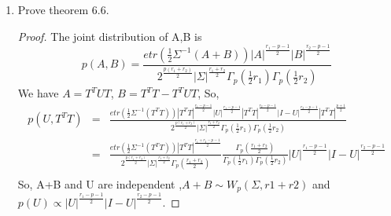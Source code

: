 \documentclass[10pt,a4paper]{article}
\def\BP{{\mathbb P}}
\def\A{{\bm A}}
\def\B{{\bm B}}
\def\X{{\bm X}}
\def\Y{{\bm Y}}
\def\bmu{{\bm \mu}}
\begin{document}
\begin{enumerate}
\begin{proof}[Solution]
\begin{eqnarray*}
\end{eqnarray*}
Since $(\mathbf{B}^T \otimes \mathbf{A}) \, \operatorname{vec}(\mathbf{X}) = \operatorname{vec}(\mathbf{AXB}),$
\begin{eqnarray*}
\BP(\X) &=& \frac{1}{(2\pi)^{\frac{np}{2}}|\A|^{\frac{n}{2}}|\B|^{\frac{n}{2}}}\exp(-\frac{1}{2}(vec(\X^T)-vec(\bmu^T))^T vec(\A^{-1}(\X^T-\bmu^T)(\B^{-1})^T)) \\
\end{eqnarray*}
Since $vec(\X)^Tvec(\Y)=\mbox{tr}(\X^T\Y)$,
\begin{eqnarray*}
\BP(\X) &=& \frac{1}{(2\pi)^{\frac{np}{2}}|\A|^{\frac{n}{2}}|\B|^{\frac{n}{2}}}\exp(-\frac{1}{2}\mbox{tr}((X-\bmu)\A^{-1}(\X^T-\bmu^T)(\B^{-1})^T)) \\
&=& \frac{1}{(2\pi)^{\frac{np}{2}}|\A|^{\frac{n}{2}}|\B|^{\frac{n}{2}}}\exp(-\frac{1}{2}\mbox{tr}(\A^{-1}(\X-\bmu)^T\B^{-1}(\X-\bmu)))
\end{eqnarray*}
\end{proof}
\item Prove theorem 6.6.
\begin{proof}
The joint distribution of A,B is 
$$
p(A,B) = \frac{etr(\frac{1}{2}\Sigma^{-1}(A+B))|A|^{\frac{r_1-p-1}{2}}|B|^{\frac{r_2-p-1}{2}}}{2^{\frac{p(r_1+r_2)}{2}}|\Sigma|^{\frac{r_1+r_2}{2}}\Gamma_p(\frac{1}{2}r_1)\Gamma_p(\frac{1}{2}r_2)}
$$
We have $A=T^TUT$, $B=T^TT-T^TUT$,
So,
\begin{eqnarray*}
p(U,T^TT) &=& \frac{etr(\frac{1}{2}\Sigma^{-1}(T^TT))|T^TT|^{\frac{r_1-p-1}{2}}|U|^{\frac{r_1-p-1}{2}}|T^TT|^{\frac{r_2-p-1}{2}}|I-U|^{\frac{r_2-p-1}{2}}|T^TT|^{\frac{p+1}{2}}}{2^{\frac{p(r_1+r_2)}{2}}|\Sigma|^{\frac{r_1+r_2}{2}}\Gamma_p(\frac{1}{2}r_1)\Gamma_p(\frac{1}{2}r_2)}\\
&=& \frac{etr(\frac{1}{2}\Sigma^{-1}(T^TT))|T^TT|^{\frac{r_1+r_2-p-1}{2}}}{2^{\frac{p(r_1+r_2)}{2}}|\Sigma|^{\frac{r_1+r_2}{2}}\Gamma_p(\frac{r_1+r_2}{2})}\frac{\Gamma_p(\frac{r_1+r_2}{2})}{\Gamma_p(\frac{1}{2}r_1)\Gamma_p(\frac{1}{2}r_2)}|U|^{\frac{r_1-p-1}{2}}|I-U|^{\frac{r_2-p-1}{2}}\\
\end{eqnarray*}
So, A+B and U are independent ,$A+B \sim W_p(\Sigma,r1+r2)$ and $p(U) \propto |U|^{\frac{r_1-p-1}{2}}|I-U|^{\frac{r_2-p-1}{2}}$.
\end{proof}
\end{enumerate}
\end{document}
